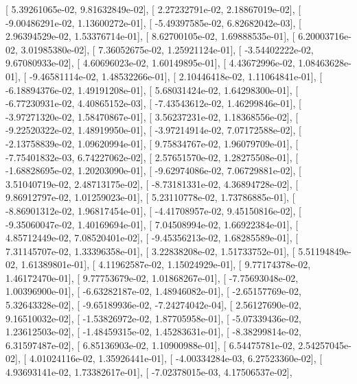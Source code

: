 \documentclass{article}
\begin{document}
       [  5.39261065e-02,   9.81632849e-02],
       [  2.27232791e-02,   2.18867019e-02],
       [ -9.00486291e-02,   1.13600272e-01],
       [ -5.49397585e-02,   6.82682042e-03],
       [  2.96394529e-02,   1.53376714e-01],
       [  8.62700105e-02,   1.69888535e-01],
       [  6.20003716e-02,   3.01985380e-02],
       [  7.36052675e-02,   1.25921124e-01],
       [ -3.54402222e-02,   9.67080933e-02],
       [  4.60696023e-02,   1.60149895e-01],
       [  4.43672996e-02,   1.08463628e-01],
       [ -9.46581114e-02,   1.48532266e-01],
       [  2.10446418e-02,   1.11064841e-01],
       [ -6.18894376e-02,   1.49191208e-01],
       [  5.68031424e-02,   1.64298300e-01],
       [ -6.77230931e-02,   4.40865152e-03],
       [ -7.43543612e-02,   1.46299846e-01],
       [ -3.97271320e-02,   1.58470867e-01],
       [  3.56237231e-02,   1.18368556e-02],
       [ -9.22520322e-02,   1.48919950e-01],
       [ -3.97214914e-02,   7.07172588e-02],
       [ -2.13758839e-02,   1.09620994e-01],
       [  9.75834767e-02,   1.96079709e-01],
       [ -7.75401832e-03,   6.74227062e-02],
       [  2.57651570e-02,   1.28275508e-01],
       [ -1.68828695e-02,   1.20203090e-01],
       [ -9.62974086e-02,   7.06729881e-02],
       [  3.51040719e-02,   2.48713175e-02],
       [ -8.73181331e-02,   4.36894728e-02],
       [  9.86912797e-02,   1.01259023e-01],
       [  5.23110778e-02,   1.73786885e-01],
       [ -8.86901312e-02,   1.96817454e-01],
       [ -4.41708957e-02,   9.45150816e-02],
       [ -9.35060047e-02,   1.40169694e-01],
       [  7.04508994e-02,   1.66922384e-01],
       [  4.85712449e-02,   7.08520401e-02],
       [ -9.45356213e-02,   1.68285589e-01],
       [  7.31145707e-02,   1.33396358e-01],
       [  3.22838208e-02,   1.51733752e-01],
       [  5.51194849e-02,   1.61389801e-01],
       [  4.11962587e-02,   1.15024929e-01],
       [  9.77174378e-02,   1.46172470e-01],
       [  9.77753679e-02,   1.01868267e-01],
       [ -7.75693048e-02,   1.00396900e-01],
       [ -6.63282187e-02,   1.48946082e-01],
       [ -2.65157769e-02,   5.32643328e-02],
       [ -9.65189936e-02,  -7.24274042e-04],
       [  2.56127690e-02,   9.16510032e-02],
       [ -1.53826972e-02,   1.87705958e-01],
       [ -5.07339436e-02,   1.23612503e-02],
       [ -1.48459315e-02,   1.45283631e-01],
       [ -8.38299814e-02,   6.31597487e-02],
       [  6.85136903e-02,   1.10900988e-01],
       [  6.54475781e-02,   2.54257045e-02],
       [  4.01024116e-02,   1.35926441e-01],
       [ -4.00334284e-03,   6.27523360e-02],
       [  4.93693141e-02,   1.73382617e-01],
       [ -7.02378015e-03,   4.17506537e-02],
\end{document}
